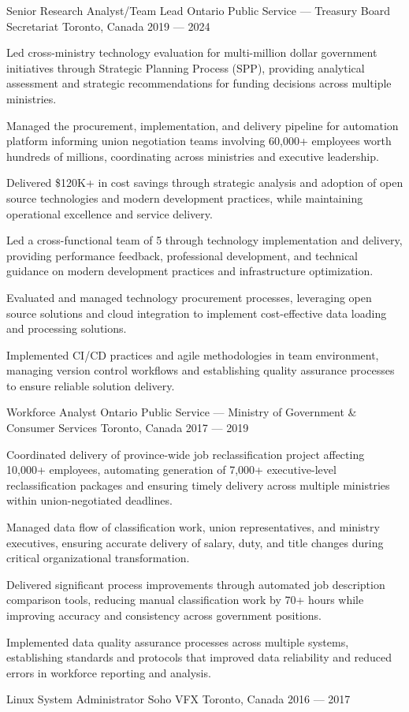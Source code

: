 \begin{cventries}
 \cventry%
 {Senior Research Analyst/Team Lead}
 {Ontario Public Service --- Treasury Board Secretariat}
 {Toronto, Canada}
 {2019 --- 2024}
 {
	\begin{cvitems}
        \item Led cross-ministry technology evaluation for multi-million dollar government initiatives through Strategic Planning Process (SPP), providing analytical assessment and strategic recommendations for funding decisions across multiple ministries.
        \item Managed the procurement, implementation, and delivery pipeline for automation platform informing union negotiation teams involving 60,000+ employees worth hundreds of millions, coordinating across ministries and executive leadership.
        \item Delivered \$120K+ in cost savings through strategic analysis and adoption of open source technologies and modern development practices, while maintaining operational excellence and service delivery.
        \item Led a cross-functional team of 5 through technology implementation and delivery, providing performance feedback, professional development, and technical guidance on modern development practices and infrastructure optimization.
        \item Evaluated and managed technology procurement processes, leveraging open source solutions and cloud integration to implement cost-effective data loading and processing solutions.
        \item Implemented CI/CD practices and agile methodologies in team environment, managing version control workflows and establishing quality assurance processes to ensure reliable solution delivery.
    \end{cvitems}
 }

\cventry%
	{Workforce Analyst}
	{Ontario Public Service --- Ministry of Government \& Consumer Services}
	{Toronto, Canada}
	{2017 --- 2019}
	{
		\begin{cvitems}
			\item Coordinated delivery of province-wide job reclassification project affecting 10,000+ employees, automating generation of 7,000+ executive-level reclassification packages and ensuring timely delivery across multiple ministries within union-negotiated deadlines.
			\item Managed data flow of classification work, union representatives, and ministry executives, ensuring accurate delivery of salary, duty, and title changes during critical organizational transformation.
			\item Delivered significant process improvements through automated job description comparison tools, reducing manual classification work by 70+ hours while improving accuracy and consistency across government positions.
			\item Implemented data quality assurance processes across multiple systems, establishing standards and protocols that improved data reliability and reduced errors in workforce reporting and analysis.
		\end{cvitems}
	}

	\cvcompactentry%
	{Linux System Administrator}
	{Soho VFX}
	{Toronto, Canada}
	{2016 --- 2017}
	{}
\end{cventries}